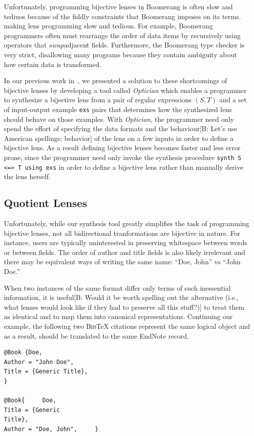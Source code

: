 \documentclass[acmsmall,review,anonymous]{acmart}
\newcommand{\FINISH}[3]{\ifdraft\textcolor{#1}{[#2: #3]}\fi}
\newcommand{\bcp}[1]{\FINISH{dkred}{B}{#1}}
\newcommand{\kw}[1]{\ensuremath{\mathit{#1}}}
\newcommand{\bibtex}{\textsc{Bib}\TeX{}}
\newcommand{\swap}{\ensuremath{\kw{swap}}}
\newcommand{\cd}[1]{\lstinline[backgroundcolor=\color{white}]$#1$}
\begin{document}
Unfortunately, programming bijective lenses in Boomerang is often slow and
tediuos because of the fiddly constraints that Boomerang imposes on its
terms. making lens programming slow and tedious. For example, Boomerang
programmers often must rearrange the order of data items by recursively using
operators that \swap adjacent fields. Furthermore, the Boomerang type checker is
very strict, disallowing many programs because they contain ambiguity about how
certain data is transformed. 

In our previous work in~\cite{optician}, we presented a solution to these
shortcomings of bijective lenses by developing a tool called {\em Optician}
which enables a programmer to synthesize a bijective lens from a pair of regular
expressions $(S, T)$ and a set of input-output example \cd{exs} pairs that
determines how the synthesized lens should behave on those examples. With {\em
Optician}, the programmer need only spend the effort of specifying the data
formats and the behaviour\bcp{Let's use American spellings: behavior} of the
lens on a few inputs in order to define a 
bijective lens. As a result defining bijective lenses becomes faster and less
error prone, since the programmer need only invoke the synthesis procedure
\lstinline{synth S <=> T using exs} in order to define a bijective lens rather
than manually derive the lens herself.

\subsection{Quotient Lenses}
Unfortunately, while our synthesis tool greatly simplifies the task of
programming bijective lenses, not all bidirectional tranformations are bijective
in nature. For instance, users are typically uninterested in preserving
whitespace between words or between fields.  The order of author and title
fields is also likely irrelevant and there may be equivalent ways of writing
the same name:  ``Doe, John'' vs ``John Doe.''

When two instances of the same format differ only terms of such inessential
information, it is useful\bcp{Would it be worth spelling out the alternative
(i.e., what lenses would look like if they had to preserve all this stuff?)}
to treat them as identical and to map them into canonical representations.
Continuing our example, the following two \bibtex{} citations represent the same
logical object and as a result, should be translated to the same EndNote record.
\begin{verbatim}
@Book {Doe,
Author = "John Doe",
Title = {Generic Title},
}

@Book{     Doe,
Title = {Generic
Title},
Author = "Doe, John",     }
\end{verbatim}
\end{document}
